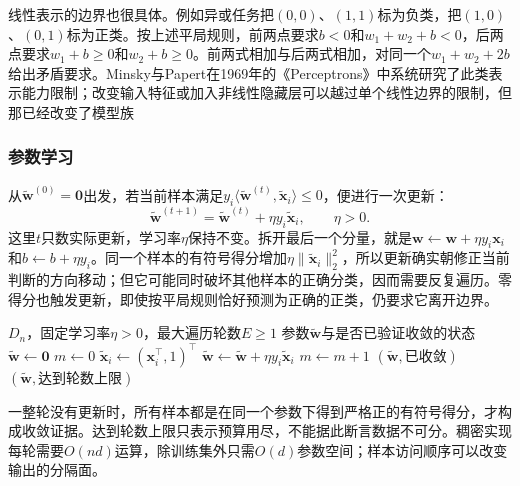 线性表示的边界也很具体。例如异或任务把$(0,0)$、$(1,1)$标为负类，把$(1,0)$、$(0,1)$标为正类。按上述平局规则，前两点要求$b<0$和$w_1+w_2+b<0$，后两点要求$w_1+b\geq0$和$w_2+b\geq0$。前两式相加与后两式相加，对同一个$w_1+w_2+2b$给出矛盾要求。Minsky与Papert在1969年的《Perceptrons》中系统研究了此类表示能力限制；改变输入特征或加入非线性隐藏层可以越过单个线性边界的限制，但那已经改变了模型族

\subsubsection{参数学习}
\label{sec:classification-perceptron-learning}

从$\tilde{\bm{w}}^{(0)}=\bm{0}$出发，若当前样本满足$y_i\langle\tilde{\bm{w}}^{(t)},\tilde{\bm{x}}_i\rangle\leq0$，便进行一次更新：
\begin{equation}
  \label{eq:classification-perceptron-update}
  \tilde{\bm{w}}^{(t+1)}
    =\tilde{\bm{w}}^{(t)}+\eta y_i\tilde{\bm{x}}_i,
    \qquad \eta>0 .
\end{equation}
这里$t$只数实际更新，学习率$\eta$保持不变。拆开最后一个分量，就是$\bm{w}\leftarrow\bm{w}+\eta y_i\bm{x}_i$和$b\leftarrow b+\eta y_i$。同一个样本的有符号得分增加$\eta\|\tilde{\bm{x}}_i\|_2^2$，所以更新确实朝修正当前判断的方向移动；但它可能同时破坏其他样本的正确分类，因而需要反复遍历。零得分也触发更新，即使按平局规则恰好预测为正确的正类，仍要求它离开边界。

\begin{algorithm}[带遍历上限的感知机训练]
  \label{alg:classification-perceptron}
  \begin{algorithmic}[1]
    \Require $D_n$，固定学习率$\eta>0$，最大遍历轮数$E\geq1$
    \Ensure 参数$\tilde{\bm{w}}$与是否已验证收敛的状态
    \State $\tilde{\bm{w}}\gets\bm{0}$
      \State $m\gets0$
        \State $\tilde{\bm{x}}_i\gets(\bm{x}_i^{\top},1)^{\top}$
          \State $\tilde{\bm{w}}\gets\tilde{\bm{w}}+\eta y_i\tilde{\bm{x}}_i$
          \State $m\gets m+1$
        \EndIf
      \EndFor
        \State \Return $(\tilde{\bm{w}},\text{已收敛})$
      \EndIf
    \EndFor
    \State \Return $(\tilde{\bm{w}},\text{达到轮数上限})$
  \end{algorithmic}
\end{algorithm}

一整轮没有更新时，所有样本都是在同一个参数下得到严格正的有符号得分，才构成收敛证据。达到轮数上限只表示预算用尽，不能据此断言数据不可分。稠密实现每轮需要$O(nd)$运算，除训练集外只需$O(d)$参数空间；样本访问顺序可以改变输出的分隔面。


